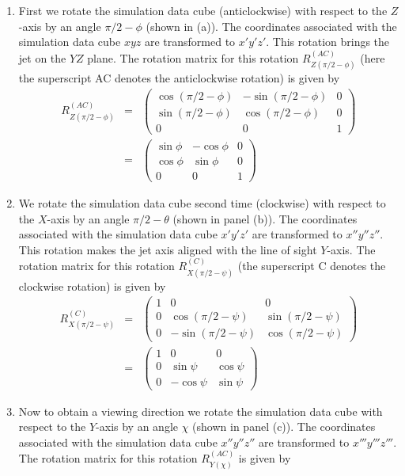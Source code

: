 \begin{enumerate}
\item First we rotate the simulation data cube (anticlockwise) with respect to the $Z$-axis by an angle $\pi/2 - \phi$ (shown in (a)). The coordinates associated with the simulation data cube $xyz$ are transformed to $x'y'z'$. This rotation brings the jet on the $YZ$ plane. The rotation matrix for this rotation $R^{(AC)}_{Z(\pi/2 - \phi)}$ (here the superscript AC denotes the anticlockwise rotation) is given by 
\begin{eqnarray}
R^{(AC)}_{Z(\pi/2 - \phi)}  &=& \begin{pmatrix}
 \cos(\pi/2 - \phi) & -\sin(\pi/2 - \phi) & 0 \\
\sin(\pi/2 - \phi) & \cos(\pi/2 - \phi) & 0 \\
0 & 0 & 1
\end{pmatrix} \nonumber \\
&=& \begin{pmatrix}
 \sin\phi & -\cos\phi & 0 \\
\cos\phi & \sin\phi & 0 \\
0 & 0 & 1
\end{pmatrix} 
\end{eqnarray}
\item We rotate the simulation data cube second time (clockwise) with respect to the $X$-axis by an angle $\pi/2 - \theta$ (shown in panel (b)). The coordinates associated with the simulation data cube $x'y'z'$ are transformed to $x''y''z''$. This rotation makes the jet axis aligned with the line of sight $Y$-axis. The rotation matrix for this rotation $R^{(C)}_{X(\pi/2 - \psi)}$ (the superscript C denotes the clockwise rotation) is given by 
\begin{eqnarray}
R^{(C)}_{X(\pi/2 - \psi)} &=& \begin{pmatrix}
 1 & 0 & 0 \\
0 & \cos(\pi/2 - \psi) & \sin(\pi/2 - \psi) \\
0 & -\sin(\pi/2 - \psi) & \cos(\pi/2 - \psi)
\end{pmatrix} \nonumber \\
& = &\begin{pmatrix}
1 & 0 & 0 \\
0 & \sin\psi & \cos\psi \\
0 & -\cos\psi & \sin\psi
\end{pmatrix}  
\end{eqnarray}
\item Now to obtain a viewing direction we rotate the simulation data cube with respect to the $Y$-axis by an angle $\chi$ (shown in panel (c)). The coordinates associated with the simulation data cube $x''y''z''$ are transformed to $x'''y'''z'''$. The rotation matrix for this rotation $R^{(AC)}_{Y(\chi)} $ is given by

\end{enumerate}
